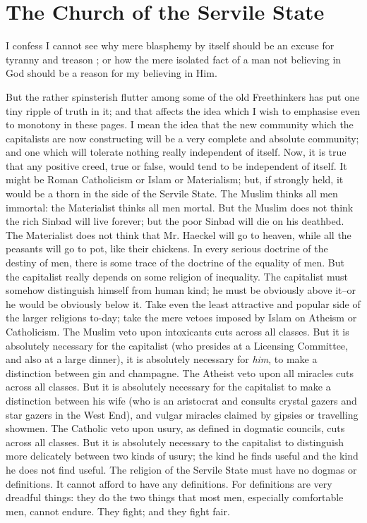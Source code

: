 \documentclass{book}
\begin{document}
\chapter{The Church of the Servile State}
\label{chapter-4}
I confess I cannot see why mere blasphemy by itself should be an excuse for tyranny and treason ; or how the mere isolated fact of a man not believing in God should be a reason for my believing in Him.

But the rather spinsterish flutter among some of the old Freethinkers has put one tiny ripple of truth in it; and that affects the idea which I wish to emphasise even to monotony in these pages. I mean the idea that the new community which the capitalists are now constructing will be a very complete and absolute community; and one which will tolerate nothing really independent of itself. Now, it is true that any positive creed, true or false, would tend to be independent of itself. It might be Roman Catholicism or Islam or Materialism; but, if strongly held, it would be a thorn in the side of the Servile State. The Muslim thinks all men immortal: the Materialist thinks all men mortal. But the Muslim does not think the rich Sinbad will live forever; but the poor Sinbad will die on his deathbed. The Materialist does not think that Mr. Haeckel will go to heaven, while all the peasants will go to pot, like their chickens. In every serious doctrine of the destiny of men, there is some trace of the doctrine of the equality of men. But the capitalist really depends on some religion of inequality. The capitalist must somehow distinguish himself from human kind; he must be obviously above it–or he would be obviously below it. Take even the least attractive and popular side of the larger religions to-day; take the mere vetoes imposed by Islam on Atheism or Catholicism. The Muslim veto upon intoxicants cuts across all classes. But it is absolutely necessary for the capitalist (who presides at a Licensing Committee, and also at a large dinner), it is absolutely necessary for \emph{him}, to make a distinction between gin and champagne. The Atheist veto upon all miracles cuts across all classes. But it is absolutely necessary for the capitalist to make a distinction between his wife (who is an aristocrat and consults crystal gazers and star gazers in the West End), and vulgar miracles claimed by gipsies or travelling showmen. The Catholic veto upon usury, as defined in dogmatic councils, cuts across all classes. But it is absolutely necessary to the capitalist to distinguish more delicately between two kinds of usury; the kind he finds useful and the kind he does not find useful. The religion of the Servile State must have no dogmas or definitions. It cannot afford to have any definitions. For definitions are very dreadful things: they do the two things that most men, especially comfortable men, cannot endure. They fight; and they fight fair.
\end{document}
